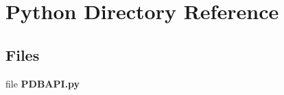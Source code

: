 \section{Python Directory Reference}
\label{dir_8669bb0c9144cb4951e4111ac38d1610}
\subsection*{Files}
\begin{DoxyCompactItemize}
\item 
file {\bf P\+D\+B\+A\+P\+I.\+py}
\end{DoxyCompactItemize}
